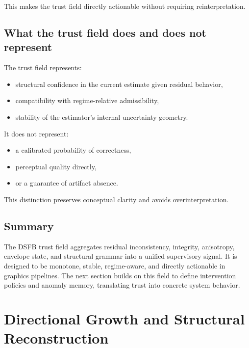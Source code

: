 \documentclass[11pt,letterpaper]{article}
\theoremstyle{gcresult}
\theoremstyle{definition}
\begin{document}
This makes the trust field directly actionable without requiring reinterpretation.


\subsection{What the trust field does and does not represent}

The trust field represents:
\begin{itemize}[leftmargin=1.5em]
    \item structural confidence in the current estimate given residual behavior,
    \item compatibility with regime-relative admissibility,
    \item stability of the estimator’s internal uncertainty geometry.
\end{itemize}

It does not represent:
\begin{itemize}[leftmargin=1.5em]
    \item a calibrated probability of correctness,
    \item perceptual quality directly,
    \item or a guarantee of artifact absence.
\end{itemize}

This distinction preserves conceptual clarity and avoids overinterpretation.


\subsection{Summary}

The DSFB trust field aggregates residual inconsistency, integrity, anisotropy, envelope state, and structural grammar into a unified supervisory signal. It is designed to be monotone, stable, regime-aware, and directly actionable in graphics pipelines. The next section builds on this field to define intervention policies and anomaly memory, translating trust into concrete system behavior.
\section{Directional Growth and Structural Reconstruction}
\end{document}
